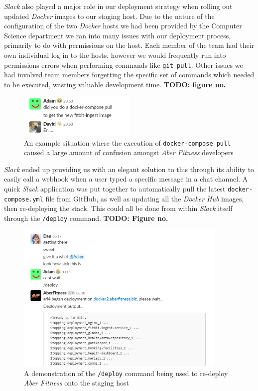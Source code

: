 \textit{Slack} also played a major role in our deployment strategy when rolling out updated \textit{Docker} images to our staging host. Due to the nature of the configuration of the two \textit{Docker} hosts we had been provided by the Computer Science department we ran into many issues with our deployment process, primarily to do with permissions on the host. Each member of the team had their own individual log in to the hosts, however we would frequently run into permissions errors when performing commands like \lstinline{git pull}. Other issues we had involved team members forgetting the specific set of commands which needed to be executed, wasting valuable development time. \textbf{TODO: figure no.}

\begin{figure}[H]
    \centering
    \includegraphics[width=0.5\textwidth]{Images/aberfitness_slack_bot_reason_why.png}
    \caption{An example situation where the execution of \lstinline{docker-compose pull} caused a large amount of confusion amongst \textit{Aber Fitness} developers}
\end{figure}


\textit{Slack} ended up providing us with an elegant solution to this through its ability to easily call a webhook when a user typed a specific message in a chat channel. A quick \textit{Slack} application was put together to automatically pull the latest \lstinline{docker-compose.yml} file from GitHub, as well as updating all the \textit{Docker Hub} images, then re-deploying the stack. This could all be done from within \textit{Slack} itself through the \lstinline{/deploy} command. \textbf{TODO: Figure no.}

\begin{figure}[H]
    \centering
    \includegraphics[width=0.9\textwidth]{Images/aberfitness_slack_bot.png}
    \caption{A demonstration of the \lstinline{/deploy} command being used to re-deploy \textit{Aber Fitness} onto the staging host}
\end{figure}


